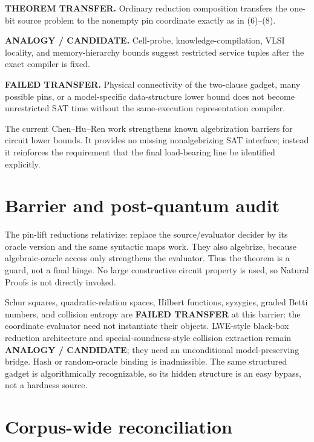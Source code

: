 \documentclass[11pt]{article}
\begin{document}
\begin{description}[leftmargin=0cm,labelwidth=0cm]
\item[] \textbf{THEOREM TRANSFER.}
Ordinary reduction composition transfers the one-bit source problem to the
nonempty pin coordinate exactly as in (6)--(8).
\item[] \textbf{ANALOGY / CANDIDATE.}
Cell-probe, knowledge-compilation, VLSI locality, and memory-hierarchy bounds
suggest restricted service tuples after the exact compiler is fixed.
\item[] \textbf{FAILED TRANSFER.}
Physical connectivity of the two-clause gadget, many possible pins, or a
model-specific data-structure lower bound does not become unrestricted SAT
time without the same-execution representation compiler.
\end{description}

The current Chen--Hu--Ren work strengthens known algebrization barriers for
circuit lower bounds.  It provides no missing nonalgebrizing SAT interface;
instead it reinforces the requirement that the final load-bearing line be
identified explicitly.

\section{Barrier and post-quantum audit}

The pin-lift reductions relativize: replace the source/evaluator decider by
its oracle version and the same syntactic maps work.  They also algebrize,
because algebraic-oracle access only strengthens the evaluator.  Thus the
theorem is a guard, not a final hinge.  No large constructive circuit property
is used, so Natural Proofs is not directly invoked.

Schur squares, quadratic-relation spaces, Hilbert functions, syzygies, graded
Betti numbers, and collision entropy are \textbf{FAILED TRANSFER} at this
barrier: the coordinate evaluator need not instantiate their objects.
LWE-style black-box reduction architecture and special-soundness-style
collision extraction remain \textbf{ANALOGY / CANDIDATE}; they need an
unconditional model-preserving bridge.  Hash or random-oracle binding is
inadmissible.  The same structured gadget is algorithmically recognizable,
so its hidden structure is an easy bypass, not a hardness source.

\section{Corpus-wide reconciliation}
\end{document}
